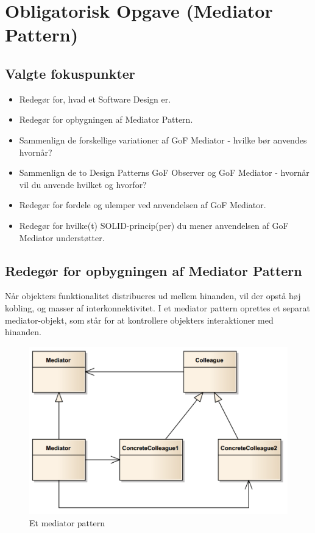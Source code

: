 \section{Obligatorisk Opgave (Mediator Pattern)}

\subsection{Valgte fokuspunkter}

\begin{itemize}
	\item Redegør for, hvad et Software Design er.
	\item Redegør for opbygningen af Mediator Pattern.
	\item Sammenlign de forskellige variationer af GoF Mediator - hvilke bør anvendes hvornår?
	\item Sammenlign de to Design Patterns GoF Observer og GoF Mediator - hvornår vil du anvende hvilket og hvorfor?
	\item Redegør for fordele og ulemper ved anvendelsen af GoF Mediator.
	\item Redegør for hvilke(t) SOLID-princip(per) du mener anvendelsen af GoF Mediator understøtter.
\end{itemize}



\subsection{Redegør for opbygningen af Mediator Pattern}
Når objekters funktionalitet distribueres ud mellem hinanden, vil der opstå høj kobling, og masser
af interkonnektivitet. I et mediator pattern oprettes et separat mediator-objekt, som står for at
kontrollere objekters interaktioner med hinanden.

\begin{figure}[H]
	\centering
	\includegraphics[width=0.7\linewidth]{figs/mediator/mediatorPattern.PNG}
	\caption{Et mediator pattern}
	\label{fig:mediatorPattern}
\end{figure}

